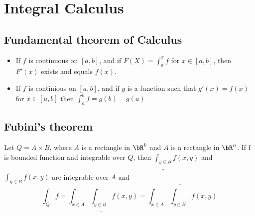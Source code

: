 \section{Integral Calculus}

\subsection{Fundamental theorem of Calculus}
\begin{itemize}
\item
	If $f$ is continuous on $[a, b]$, and if $F(X)=\int_a^x f$
	for $x\in[a,b]$, then $F'(x)$ exists and equals $f(x)$.
\item
	If $f$ is continious on $[a, b]$,
	and if $g$ is a function such that
	$g'(x)=f(x)$ for $x\in[a,b]$ then $\int_a^b f = g(b) - g(a)$
\end{itemize}


\subsection{Fubini's theorem}
Let $Q=A\times B$, where $A$ is a rectangle in $\bR^k$ and $A$ is a rectangle in $\bR^n$.
If f is bounded function and integrable over $Q$, then
$\underline{\int_{y\in B}} f(x,y)$ and $\overline{\int_{y\in B}} f(x,y)$ are integrable over $A$
and
\[\int_Q f = \int_{x\in A}\underline{\int_{y\in B}} f(x,y) = \int_{x\in A}\overline{\int_{y\in B}} f(x,y)\]



